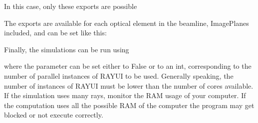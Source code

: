\documentclass[letterpaper,10pt,english]{sphinxmanual}
\begin{document}
\sphinxAtStartPar
In this case, only these exports are possible

\begin{sphinxVerbatim}[commandchars=\\\{\}]
 \PYG{p}{[} \PYG{p}{]}
\end{sphinxVerbatim}

\sphinxAtStartPar
The exports are available for each optical element in the beamline, ImagePlanes included, and can be set like this:

\begin{sphinxVerbatim}[commandchars=\\\{\}]
    \PYG{p}{[}\PYG{p}{[}\PYG{p}{]}
                \PYG{p}{[}\PYG{p}{]}
                \PYG{p}{]}
\end{sphinxVerbatim}

\sphinxAtStartPar
Finally, the simulations can be run using

\begin{sphinxVerbatim}[commandchars=\\\{\}]
 
\end{sphinxVerbatim}

\sphinxAtStartPar
where the  parameter can be set either to False or to an int, corresponding to the number of parallel instances of RAY\sphinxhyphen{}UI to be used. Generally speaking, the number of instances of RAY\sphinxhyphen{}UI must be lower than the number of cores available. If the simulation uses many rays, monitor the RAM usage of your computer. If the computation uses all the possible RAM of the computer the program may get blocked or not execute correctly.
\end{document}
